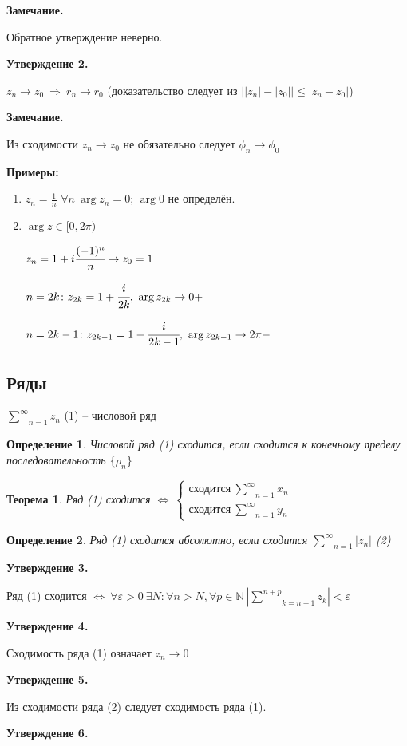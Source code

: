 \documentclass[draft]{report}
\newcommand{\then}{\ \Rightarrow\ }
\newcommand{\N}{\mathbb{N}}
\newcommand{\ind}[3]{\underset{#1}{\overset{#2}{#3}}}
\newcommand{\LRA}{\Leftrightarrow}
\renewcommand{\f}{\phi}
\newcommand{\e}{\varepsilon}
\newcommand{\rd}{\underset{n=1}{\overset{\infty}{\sum}}}
\newcommand{\sys}[1]{\left\{\begin{matrix}#1\end{matrix}\right.}
\newcommand{\opr}[1]{\begin{opred}#1\end{opred}}
\newtheorem*{theor}{Теорема}
\newtheorem*{opred}{Определение}
\theoremstyle{remark}
\begin{document}
{\bfseries Замечание.}

Обратное утверждение неверно.

{\bfseries Утверждение 2.}

$z_n\to z_0\then r_n\to r_0$ (доказательство следует из $\bigl||z_n|-|z_0|\bigr|\leq|z_n-z_0|$)

{\bfseries Замечание.}

Из сходимости $z_n\to z_0$ не обязательно следует $\f_n\to\f_0$

{\bfseries Примеры:}
\begin{enumerate}
\item $z_n=\frac1n$ $\forall n\ \arg z_n=0$; $\arg 0$ не определён.
\item $\arg z\in[0,2\pi)$

$z_n=1+i\cfrac{(-1)^n}{n}\to z_0=1$

$n=2k\colon z_{2k}=1+\cfrac{i}{2k},\ \arg z_{2k}\to0+$

$n=2k-1\colon z_{2k-1}=1-\cfrac{i}{2k-1},\ \arg z_{2k-1}\to2\pi-$
\end{enumerate}

\subsection{Ряды}

$\ind{n=1}{\infty}{\sum}z_n$ (1) -- числовой ряд

\opr{Числовой ряд (1) сходится, если сходится к конечному пределу последовательность $\{\rho_n\}$}

\begin{theor}
Ряд (1) сходится $\LRA\ \sys{\mbox{сходится}\ \ind{n=1}{\infty}{\sum}x_n \\ \mbox{сходится}\ \ind{n=1}{\infty}{\sum}y_n }$
\end{theor}

\opr{Ряд (1) сходится абсолютно, если сходится $\rd |z_n|$ (2)}

{\bfseries Утверждение 3.}

Ряд (1) сходится $\LRA\ \forall\e>0\ \exists N\colon\forall n>N,\forall p\in\N\ \left|\ind{k=n+1}{n+p}{\sum}z_k\right|<\e$

{\bfseries Утверждение 4.}

Сходимость ряда (1) означает $z_n\to 0$

{\bfseries Утверждение 5.}

Из сходимости ряда (2) следует сходимость ряда (1).

{\bfseries Утверждение 6.}
\end{document}
